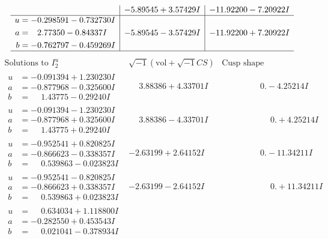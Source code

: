 \documentclass[1p]{elsarticle_modified}
\theoremstyle{definition}
\newcommand{\I}{\sqrt{-1}}
\begin{document}
$$\begin{array}{c|c|c}
 & -5.89545 + 3.57429 I & -11.92200 - 7.20922 I \\ \hline\begin{aligned}
u &= -0.298591 - 0.732730 I \\
a &= \phantom{-}2.77350 - 0.84337 I \\
b &= -0.762797 - 0.459269 I\end{aligned}
 & -5.89545 - 3.57429 I & -11.92200 + 7.20922 I\\
 \hline 
 \end{array}$$\newpage$$\begin{array}{c|c|c}  
\text{Solutions to }I^u_{2}& \I (\text{vol} + \sqrt{-1}CS) & \text{Cusp shape}\\
 \hline 
\begin{aligned}
u &= -0.091394 + 1.230230 I \\
a &= -0.877968 - 0.325600 I \\
b &= \phantom{-}1.43775 - 0.29240 I\end{aligned}
 & \phantom{-}3.88386 + 4.33701 I & \phantom{-0.000000 } 0. - 4.25214 I \\ \hline\begin{aligned}
u &= -0.091394 - 1.230230 I \\
a &= -0.877968 + 0.325600 I \\
b &= \phantom{-}1.43775 + 0.29240 I\end{aligned}
 & \phantom{-}3.88386 - 4.33701 I & \phantom{-0.000000 -}0. + 4.25214 I \\ \hline\begin{aligned}
u &= -0.952541 + 0.820825 I \\
a &= -0.866623 - 0.338357 I \\
b &= \phantom{-}0.539863 - 0.023823 I\end{aligned}
 & -2.63199 + 2.64152 I & \phantom{-0.000000 } 0. - 11.34211 I \\ \hline\begin{aligned}
u &= -0.952541 - 0.820825 I \\
a &= -0.866623 + 0.338357 I \\
b &= \phantom{-}0.539863 + 0.023823 I\end{aligned}
 & -2.63199 - 2.64152 I & \phantom{-0.000000 -}0. + 11.34211 I \\ \hline\begin{aligned}
u &= \phantom{-}0.634034 + 1.118800 I \\
a &= -0.282550 + 0.453543 I \\
b &= \phantom{-}0.021041 - 0.378934 I\end{aligned}

\end{array}$$
\end{document}
